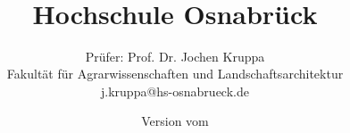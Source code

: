 \def\Rlogo{\texttt{[image: \\mainDir/exam/img/Rlogo]}\;}

\usepackage[scaled=.90]{helvet} 
\usepackage{fancyhdr}
\usepackage{lastpage}
\usepackage{hyperref}
\hypersetup{
    colorlinks=true,       %
    linkcolor=black,          %
    urlcolor=magenta           %
}
\renewcommand{\familydefault}{\sfdefault}

\title{
\large \exammodule \\[5Ex]
\Huge \examtitle \\[2Ex] 
\Large Hochschule Osnabrück
}
\author{Prüfer: Prof. Dr. Jochen Kruppa \\
Fakultät für Agrarwissenschaften und Landschaftsarchitektur \\ 
j.kruppa@hs-osnabrueck.de}
\date{Version vom \examdate}

\renewcommand{\headrulewidth}{0pt}
\renewcommand{\footrulewidth}{0pt}
\pagestyle{fancy}

\fancyhf{}
\fancyhead[L]{}
\fancyhead[R]{}
\fancyfoot[R]{\thepage}
\fancyfoot[L]{\footnotesize \examtitle}


\usepackage{arevtext,arevmath}

\newcommand\Tstrut{\rule{0pt}{2.6ex}}         %
\newcommand\Bstrut{\rule[-0.9ex]{0pt}{0pt}}   %
\def\strut{\Tstrut\Bstrut}

